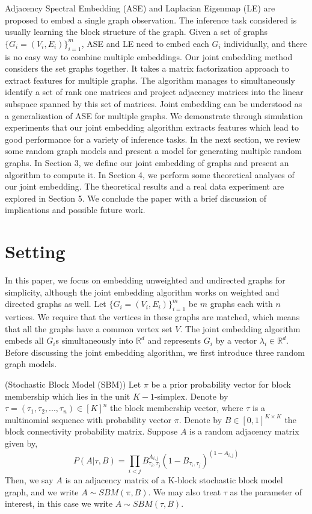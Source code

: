 \documentclass[10pt,journal,compsoc]{IEEEtran}
\newenvironment{definition}[1][Definition]{\begin{trivlist}
		\item[\hskip \labelsep {\bfseries #1}]}{\end{trivlist}}
\begin{document}
\noindent Adjacency Spectral Embedding (ASE) and Laplacian Eigenmap (LE) are proposed to embed a single graph observation\cite{sussman2012consistent}\cite{belkin2003laplacian}. The inference task considered is usually learning the block structure of the graph. Given a set of graphs $\{G_i=(V_i,E_i)\} _{i=1}^{m}$, ASE and LE need to embed each $G_i$ individually, and there is no easy way to combine multiple embeddings. Our joint embedding method considers the set graphs together. It takes a matrix factorization approach to extract features for multiple graphs. The algorithm manages to simultaneously identify a set of rank one matrices and project adjacency matrices into the linear subspace spanned by this set of matrices. Joint embedding can be understood as a generalization of ASE for multiple graphs. We demonstrate through simulation experiments that our joint embedding algorithm extracts features which lead to good performance for a variety of inference tasks. In the next section, we review some random graph models and present a model for generating multiple random graphs. In Section 3, we define our joint embedding of graphs and present an algorithm to compute it. In Section 4, we perform some theoretical analyses of our joint embedding. The theoretical results and a real data experiment are explored in Section 5. We conclude the paper with a brief discussion of implications and possible future work.

\section{Setting}
In this paper, we focus on embedding unweighted and undirected graphs for simplicity, although the joint embedding algorithm works on weighted and directed graphs as well. Let $\{G_i=(V_i,E_i)\} _{i=1}^{m}$ be $m$ graphs each with $n$ vertices. We require that the vertices in these graphs are matched, which means that all the graphs have a common vertex set $V$. The joint embedding algorithm embeds all $G_i$s simultaneously into $\mathbb{R}^d$ and represents $G_i$  by a vector $\lambda_i \in \mathbb{R}^d$. Before discussing the joint embedding algorithm, we first introduce three random graph models.

\begin{definition} (Stochastic Block Model (SBM)) Let $\pi$ be a prior probability vector for block membership which lies in the unit $K-1$-simplex. Denote by $\tau=(\tau_1,\tau_2,...,\tau_n) \in [K]^n$ the block membership vector, where $\tau$ is a multinomial sequence with probability vector $\pi$.
Denote by $B \in [0,1]^{K \times K}$ the block connectivity probability matrix. Suppose $A$ is a random adjacency matrix given by,
\[ P(A|\tau,B)= \prod_{i<j} B_{\tau_i,\tau_j}^{A_{i,j}} (1-B_{\tau_i,\tau_j})^{(1-A_{i,j})}\] 
Then, we say $A$ is an adjacency matrix of a K-block stochastic block model graph, and we write $A \sim SBM(\pi,B)$. We may also treat $\tau$ as the parameter of interest, in this case we write $A \sim SBM(\tau,B)$.
\end{definition}
\end{document}
